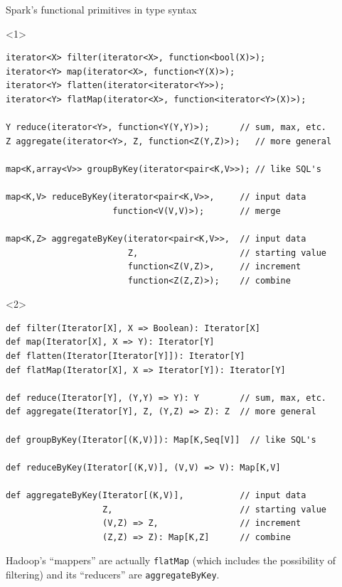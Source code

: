 \documentclass{beamer}
\begin{document}
\begin{frame}[fragile]{Spark's functional primitives in  type syntax}
\small
\begin{onlyenv}<1>
\begin{verbatim}
iterator<X> filter(iterator<X>, function<bool(X)>);
iterator<Y> map(iterator<X>, function<Y(X)>);
iterator<Y> flatten(iterator<iterator<Y>>);
iterator<Y> flatMap(iterator<X>, function<iterator<Y>(X)>);

Y reduce(iterator<Y>, function<Y(Y,Y)>);      // sum, max, etc.
Z aggregate(iterator<Y>, Z, function<Z(Y,Z)>);   // more general

map<K,array<V>> groupByKey(iterator<pair<K,V>>); // like SQL's

map<K,V> reduceByKey(iterator<pair<K,V>>,     // input data
                     function<V(V,V)>);       // merge

map<K,Z> aggregateByKey(iterator<pair<K,V>>,  // input data
                        Z,                    // starting value
                        function<Z(V,Z)>,     // increment
                        function<Z(Z,Z)>);    // combine
\end{verbatim}
\end{onlyenv}
\begin{onlyenv}<2>
\begin{verbatim}
def filter(Iterator[X], X => Boolean): Iterator[X]
def map(Iterator[X], X => Y): Iterator[Y]
def flatten(Iterator[Iterator[Y]]): Iterator[Y]
def flatMap(Iterator[X], X => Iterator[Y]): Iterator[Y]

def reduce(Iterator[Y], (Y,Y) => Y): Y        // sum, max, etc.
def aggregate(Iterator[Y], Z, (Y,Z) => Z): Z  // more general

def groupByKey(Iterator[(K,V)]): Map[K,Seq[V]]  // like SQL's

def reduceByKey(Iterator[(K,V)], (V,V) => V): Map[K,V]

def aggregateByKey(Iterator[(K,V)],           // input data
                   Z,                         // starting value
                   (V,Z) => Z,                // increment
                   (Z,Z) => Z): Map[K,Z]      // combine
\end{verbatim}
\end{onlyenv}

\normalsize
Hadoop's ``mappers'' are actually {\tt flatMap} (which includes the possibility of filtering) and its ``reducers'' are {\tt aggregateByKey}.
\end{frame}
\end{document}
